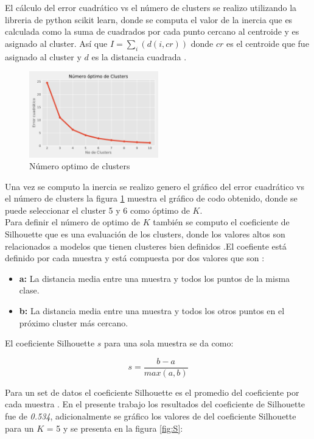 El cálculo del error cuadrático vs el número de clusters se realizo utilizando la libreria de python scikit learn, donde se computa el valor de la inercia que es calculada como la suma de cuadrados por cada punto cercano al centroide y es asignado al cluster. Así que  $I = \sum_{i}(d(i,cr))$ donde $cr$ es el centroide que fue asignado al cluster y $d$ es la distancia cuadrada \cite{scikit-learn}. 

\begin{figure}[H] 
	\centering
	\includegraphics[width=0.5\textwidth]{Kap4/Clusters}
	\caption{Número optimo de clusters} 
	\label{fig:Clusters}
\end{figure}

Una vez se computo la inercia se realizo genero el gráfico del error cuadrático vs el número de clusters  la figura \ref{fig:Clusters} muestra el gráfico de codo obtenido, donde se puede seleccionar el cluster 5 y 6 como óptimo de $K$.\\

Para definir el número de optimo de $K$ también se computo el coeficiente de Silhouette que es una evaluación de los clusters, donde los valores altos son relacionados a modelos que tienen clusteres bien definidos .El coefiente está definido por cada muestra y está compuesta por dos valores que son \cite{scikit-learn,Rousseeuw1987}:

\begin{itemize}
	\item \textbf{a:} La distancia media entre una muestra y todos los puntos de la misma clase.
	\item \textbf{b:} La distancia media entre una muestra y todos los otros puntos en el próximo cluster más cercano.
\end{itemize}

El coeficiente Silhouette $s$ para una sola muestra se da como:

$$s = \frac{b-a}{max(a,b)}$$

Para un set de datos el coeficiente Silhouette es el promedio del coeficiente por cada muestra \cite{scikit-learn,Rousseeuw1987}. En el presente trabajo los resultados del coeficiente de Silhouette fue de  \textit{0.534}, adicionalmente se gráfico los valores de del coeficiente Silhouette para un $K$ = 5 y se presenta en la figura \ref{fig:S}:

